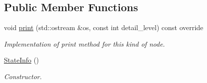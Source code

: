 \subsection*{Public Member Functions}
\begin{DoxyCompactItemize}
\item 
void \hyperlink{structStateInfo_af50fac3fb978c2de96361a42d8087962}{print} (std\+::ostream \&os, const int detail\+\_\+level) const override
\begin{DoxyCompactList}\small\item\em Implementation of print method for this kind of node. \end{DoxyCompactList}\item 
\hyperlink{structStateInfo_abacb72861ce64fb720801c42802a5068}{State\+Info} ()
\begin{DoxyCompactList}\small\item\em Constructor. \end{DoxyCompactList}\end{DoxyCompactItemize}
